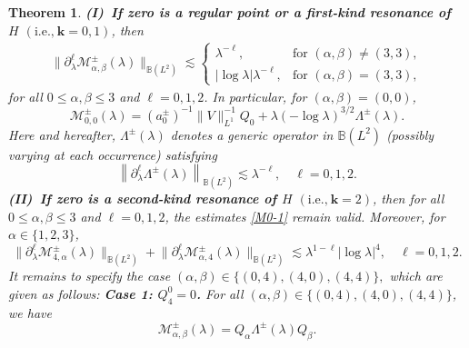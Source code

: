 \documentclass[reqno]{amsart}
\newtheorem{theorem}{Theorem}[section]
\numberwithin{equation}{section}
\begin{document}
\begin{theorem}
	\vskip0.3cm  
	\textbf{{\rm (I)}\  If zero is a regular point or a first-kind resonance of $H$} $(\text{i.e.,}\  \mathbf{k}=0,1 )$, then 
	\begin{align}\label{M0-1}
	\Big\| \partial_\lambda^\ell \mathcal{M}_{\alpha,\beta}^\pm(\lambda) \Big\|_{\mathbb{B}(L^2)} \lesssim
	\begin{cases}
		\lambda^{-\ell}, & \text{for } ( \alpha,\beta) \neq (3,3), \\
		|\log \lambda| \lambda^{-\ell}, &  \text{for } (\alpha,\beta) = (3,3),
	\end{cases}
	\end{align}
for  all $0 \le \alpha, \beta \le 3$ and $\ell=0,1,2$.	In particular, for  $(\alpha, \beta) = (0,0)$,
	\[
		\mathcal{M}_{0,0}^\pm(\lambda) = (a_0^\pm)^{-1} \|V\|_{L^1}^{-1}Q_0  + \lambda (-\log \lambda)^{3/2}\Lambda^\pm(\lambda).
	\]	  
Here and hereafter,  $\Lambda^\pm(\lambda)$ denotes a generic operator in $\mathbb{B}(L^2)$ (possibly varying at each occurrence) satisfying
$$
\left\|\partial_\lambda^\ell \Lambda^\pm(\lambda)\right\|_{\mathbb{B}(L^2)} \lesssim \lambda^{-\ell},\quad \ell = 0, 1, 2.$$
	\vskip0.1cm
	 \textbf{{\rm (II)}\ If  zero is a  second-kind resonance of $H$} $(\text{i.e.,}\  \mathbf{k}=2 )$,  then
	for all $0 \le \alpha, \beta \le 3$ and $\ell=0,1,2$, the estimates \eqref{M0-1} remain valid. Moreover,
for $\alpha \in \{1,2,3\}$,   
	\[  
	\big\|\partial_\lambda^\ell \mathcal{M}_{4,\alpha}^\pm(\lambda)\big\|_{\mathbb{B}(L^2)} + \big\|\partial_\lambda^\ell \mathcal{M}_{\alpha,4}^\pm(\lambda)\big\|_{\mathbb{B}(L^2)} \lesssim \lambda^{1-\ell}|\log \lambda|^{4}, \quad \ell = 0,1,2.  
	\]  
	It remains to specify the case
	$
	(\alpha,\beta)
	\in
	\{(0,4),(4,0),(4,4)\}
,$
	which are given as follows:
	\vskip0.3cm
	\textbf{Case 1: $Q_4^0 = 0$.}   For all $(\alpha,\beta)
	\in
	\{(0,4),(4,0),(4,4)\}$, we have
	\[
	\mathcal{M}_{\alpha,\beta}^\pm(\lambda) = Q_\alpha \Lambda^\pm(\lambda)Q_\beta.
	\]
    

\end{theorem}
\end{document}
